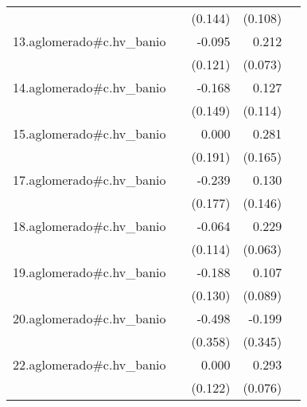 {\begin{longtable}{l*{4}{D{.}{.}{-1}}}
            &                     &     (0.144)         &     (0.108)         &                     \\
\addlinespace
13.aglomerado#c.hv\_banio&                     &      -0.095         &       0.212\sym{**} &                     \\
            &                     &     (0.121)         &     (0.073)         &                     \\
\addlinespace
14.aglomerado#c.hv\_banio&                     &      -0.168         &       0.127         &                     \\
            &                     &     (0.149)         &     (0.114)         &                     \\
\addlinespace
15.aglomerado#c.hv\_banio&                     &       0.000         &       0.281         &                     \\
            &                     &     (0.191)         &     (0.165)         &                     \\
\addlinespace
17.aglomerado#c.hv\_banio&                     &      -0.239         &       0.130         &                     \\
            &                     &     (0.177)         &     (0.146)         &                     \\
\addlinespace
18.aglomerado#c.hv\_banio&                     &      -0.064         &       0.229\sym{***}&                     \\
            &                     &     (0.114)         &     (0.063)         &                     \\
\addlinespace
19.aglomerado#c.hv\_banio&                     &      -0.188         &       0.107         &                     \\
            &                     &     (0.130)         &     (0.089)         &                     \\
\addlinespace
20.aglomerado#c.hv\_banio&                     &      -0.498         &      -0.199         &                     \\
            &                     &     (0.358)         &     (0.345)         &                     \\
\addlinespace
22.aglomerado#c.hv\_banio&                     &       0.000         &       0.293\sym{***}&                     \\
            &                     &     (0.122)         &     (0.076)         &                     \\

\end{longtable}}
